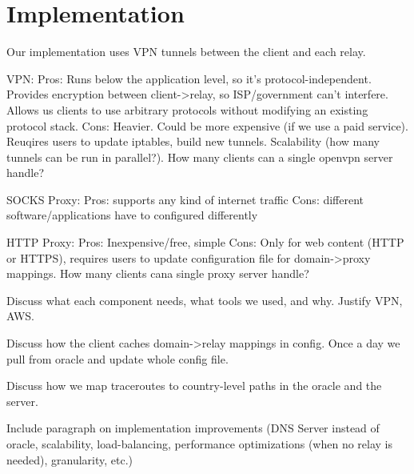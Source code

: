\section{Implementation}
\label{implementation}

Our implementation uses VPN tunnels between the client and each relay.

VPN:
    Pros: Runs below the application level, so it's protocol-independent.  Provides encryption between client->relay, so ISP/government can't interfere.  Allows us clients to use arbitrary protocols without modifying an existing protocol stack.
    Cons: Heavier.  Could be more expensive (if we use a paid service).  Reuqires users to update iptables, build new tunnels.  Scalability (how many tunnels can be run in parallel?).  How many clients can a single openvpn server handle?

SOCKS Proxy:
    Pros: supports any kind of internet traffic
    Cons: different software/applications have to configured differently

HTTP Proxy:
    Pros: Inexpensive/free, simple
    Cons: Only for web content (HTTP or HTTPS), requires users to update configuration file for domain->proxy mappings.  How many clients cana single proxy server handle?


Discuss what each component needs, what tools we used, and why.  Justify VPN, AWS.

Discuss how the client caches domain->relay mappings in config.  Once a day we pull from oracle and update whole config file.

Discuss how we map traceroutes to country-level paths in the oracle and the server.

Include paragraph on implementation improvements (DNS Server instead of oracle, scalability, load-balancing, performance optimizations (when no relay is needed), granularity, etc.)
